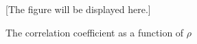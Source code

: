 



\begin{figure}[hH]

[The figure will be displayed here.]

\caption{The correlation coefficient as a function of $\rho$}
\end{figure}


